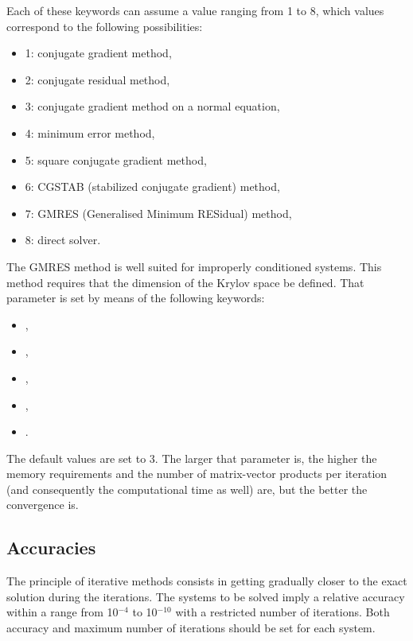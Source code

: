 Each of these keywords can assume a value ranging from 1 to 8, which values
correspond to the following possibilities:

\begin{itemize}
\item 1: conjugate gradient method,

\item 2: conjugate residual method,

\item 3: conjugate gradient method on a normal equation,

\item 4: minimum error method,

\item 5: square conjugate gradient method,

\item 6: CGSTAB (stabilized conjugate gradient) method,

\item 7: GMRES (Generalised Minimum RESidual) method,

\item 8: direct solver.
\end{itemize}

The GMRES method is well suited for improperly conditioned systems. This method
requires that the dimension of the Krylov space be defined. That parameter is
set by means of the following keywords:

\begin{itemize}
\item {},

\item {},

\item {},

\item {},

\item {}.
\end{itemize}

The default values are set to 3. The larger that parameter is, the higher the
memory requirements and the number of matrix-vector products per iteration (and
consequently the computational time as well) are, but the better the
convergence is.

\subsection{Accuracies}
\label{sec:accuracy}
The principle of iterative methods consists in getting gradually closer to the
exact solution during the iterations. The systems to be solved imply a relative
accuracy within a range from 10${}^{-4}$ to 10${}^{-10}$ with a restricted
number of iterations. Both accuracy and maximum number of iterations should be
set for each system.

